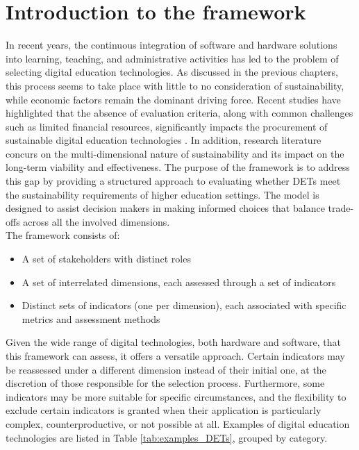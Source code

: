 \section{Introduction to the framework}
\label{sec:3.1_framework_structure}
In recent years, the continuous integration of software and hardware solutions into learning, teaching, and administrative activities has led to the problem of selecting digital education technologies. As discussed in the previous chapters, this process seems to take place with little to no consideration of sustainability, while economic factors remain the dominant driving force. Recent studies have highlighted that the absence of evaluation criteria, along with common challenges such as limited financial resources, significantly impacts the procurement of sustainable digital education technologies \cite{huang_building_2023-1}. In addition, research literature concurs on the multi-dimensional nature of sustainability and its impact on the long-term viability and effectiveness. The purpose of the framework is to address this gap by providing a structured approach to evaluating whether DETs meet the sustainability requirements of higher education settings. The model is designed to assist decision makers in making informed choices that balance trade-offs across all the involved dimensions. \\
The framework consists of:
\begin{itemize}[noitemsep, topsep=4pt, parsep=0pt, partopsep=0pt]
    \item A set of stakeholders with distinct roles
    \item A set of interrelated dimensions, each assessed through a set of indicators
    \item Distinct sets of indicators (one per dimension), each associated with specific metrics and assessment methods
\end{itemize}
Given the wide range of digital technologies, both hardware and software, that this framework can assess, it offers a versatile approach. Certain indicators may be reassessed under a different dimension instead of their initial one, at the discretion of those responsible for the selection process. Furthermore, some indicators may be more suitable for specific circumstances, and the flexibility to exclude certain indicators is granted when their application is particularly complex, counterproductive, or not possible at all. Examples of digital education technologies are listed in Table \ref{tab:examples_DETs}, grouped by category.

